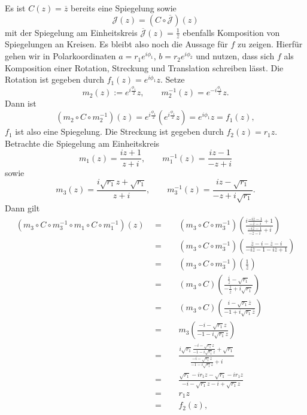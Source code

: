 \documentclass[11pt]{book}
\numberwithin{dummy}{section}
\theoremstyle{nonumberbreak}
\newenvironment{prob}[1][]{\ifthenelse{\equal{#1}{}}{\problem}{\problem[#1]}\rm}{\endproblem}
\newenvironment{sol}[1][]{\ifthenelse{\equal{#1}{}}{\solution}{\solution[#1]}\rm}{\endsolution}
\begin{document}
\begin{spacing}{1.4}
\begin{prob}
\begin{sol}
Es ist $C(z)=\overline{z}$ bereits eine Spiegelung sowie
$$\mathcal{J}(z)=(C\circ \overline{\mathcal{J}})(z)$$
mit der Spiegelung am Einheitskreis $\overline{\mathcal{J}}(z)=\frac{1}{\overline{z}}$ ebenfalls Komposition von Spiegelungen an Kreisen. Es bleibt also noch die Aussage für $f$ zu zeigen. Hierfür gehen wir in Polarkoordinaten $a=r_1 e^{i \phi_1}$, $b=r_2 e^{i\phi_2}$ und nutzen, dass sich $f$ als Komposition einer Rotation, Streckung und Translation schreiben lässt. Die Rotation ist gegeben durch 
$f_1(z)= e^{i\phi_1} z.$ Setze
$$m_2(z):= e^{i \frac{\phi_1}{2}} z, \qquad m_2^{-1}(z)=e^{-i\frac{\phi_1}{2}} z.$$
Dann ist
$$\left(m_2 \circ C \circ m_2^{-1}\right)(z)=e^{i\frac{\phi_1}{2}} \left( e^{i\frac{\phi_1}{2}} z \right) = e^{i\phi_1} z = f_1(z),$$
$f_1$ ist also eine Spiegelung. Die Streckung ist gegeben durch $f_2(z)=r_1z$. Betrachte die Spiegelung am Einheitskreis
$$m_1(z)=\frac{iz+1}{z+i}, \qquad m_1^{-1}(z)=\frac{iz-1}{-z+i}$$
sowie
$$m_3(z)=\frac{i \sqrt{r_1}z + \sqrt{r_1}}{z+i}, \qquad m_3^{-1}(z)=\frac{iz-\sqrt{r_1}}{-z+i\sqrt{r_1}}.$$
Dann gilt
\begin{alignat*}{5}
\left(m_3 \circ C \circ m_3^{-1} \circ m_1 \circ C \circ m_1^{-1}\right)(z) \ \ &=&& \ \ \left(m_3 \circ C \circ m_3^{-1}\right)\left( \frac{i \frac{-i\overline{z}-1}{-\overline{z}-i} +1}{\frac{-i\overline{z}-1}{-\overline{z}-i} +i}\right)  \\
&=&& \ \ (m_3 \circ C \circ m_3^{-1})\left( \frac{\overline{z}-i-\overline{z}-i}{-i\overline{z}-1-i\overline{z}+1}\right) \\
&=&& \ \ (m_3 \circ C \circ m_3^{-1})\left( \frac{1}{\overline{z}}\right) \\
&=&& \ \ (m_3 \circ C) \left( \frac{\frac{i}{\overline{z}} - \sqrt{r_1}}{-\frac{1}{\overline{z}} + i \sqrt{r_1}}\right) \\
&=&& \ \ (m_3 \circ C) \left(\frac{i-\sqrt{r_1} \overline{z}}{-1+i \sqrt{r_1}\overline{z}} \right) \\
&=&& \ \ m_3 \left( \frac{-i - \sqrt{r_1}z}{-1-i \sqrt{r_1}z} \right) \\
&=&& \ \ \frac{i \sqrt{r_1} \frac{-i-\sqrt{r_1}z}{-1-i\sqrt{r_1}z} + \sqrt{r_1}}{\frac{-i-\sqrt{r_1}z}{-1-i\sqrt{r_1}z} + i} \\
&=&& \ \ \frac{\sqrt{r_1}-ir_1z  - \sqrt{r_1} - i r_1 z}{-i - \sqrt{r_1}z - i + \sqrt{r_1}z} \\
&=&& \ \ r_1z\\
&=&& \ \ f_2(z),
\end{alignat*}

\end{sol}
\end{prob}
\end{spacing}
\end{document}
